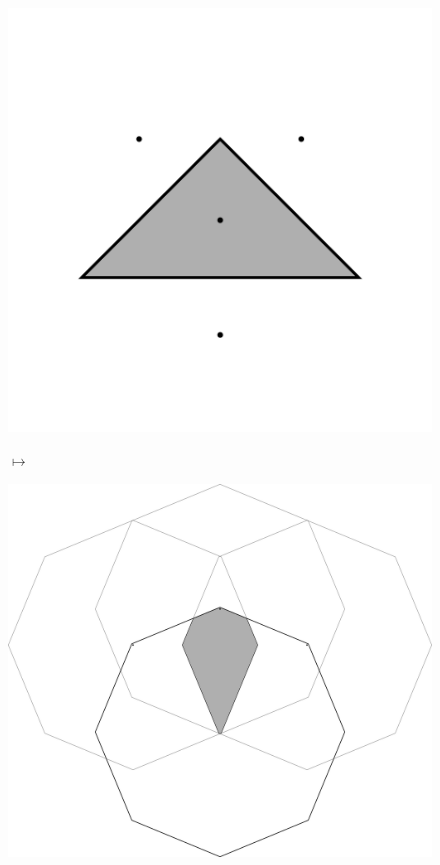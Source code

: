 \documentclass[text.tex]{subfiles}
\begin{document}
\begin{figure}[h!]
\centering
\begin{minipage}{0.25\textwidth}
\includegraphics[width=\textwidth]{img/2D/intersectionTile01}
\end{minipage}
\qquad$\longmapsto$\qquad
\begin{minipage}{0.4\textwidth}
\includegraphics[width=\textwidth]{img/2D/intersection01}

\end{minipage}
\end{figure}
\end{document}

